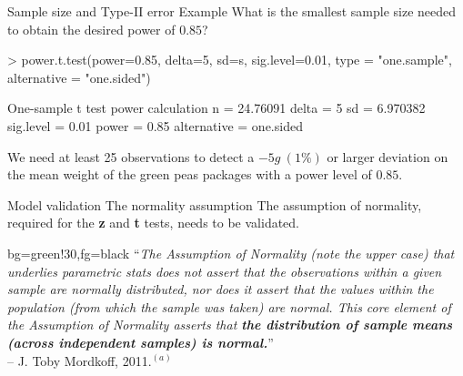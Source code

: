 \documentclass[t]{beamer}
\begin{document}

\begin{ftstf}
{Sample size and Type-II error}
{Example}
What is the smallest sample size needed to obtain the desired power of $0.85$?
\vhalf
\begin{rcode}
> power.t.test(power=0.85, delta=5, sd=s, sig.level=0.01,
               type = "one.sample", alternative = "one.sided")

One-sample t test power calculation 
n = 24.76091
delta = 5
sd = 6.970382
sig.level = 0.01
power = 0.85
alternative = one.sided
\end{rcode}
\vhalf
We need at least 25 observations to detect a $-5g\ (1\%)$ or larger deviation on the mean weight of the green peas packages with a power level of $0.85$.
\end{ftstf}

\begin{ftst}
{Model validation}
{The normality assumption}
The assumption of normality, required for the \textbf{z} and \textbf{t} tests, needs to be validated.
	\begin{colorblock}{}{bg=green!30,fg=black}
	``\textit{The Assumption of Normality (note the upper case) that underlies parametric stats does not assert that the observations within a given sample are normally distributed, nor does it assert that the values within the population (from which the sample was taken) are normal. This core element of the Assumption of Normality asserts that \textbf{the distribution of sample means (across independent samples) is normal.}}''\\
	\flushright -- J. Toby Mordkoff, 2011.$^{(a)}$
	\end{colorblock}

\end{ftst}
\end{document}
